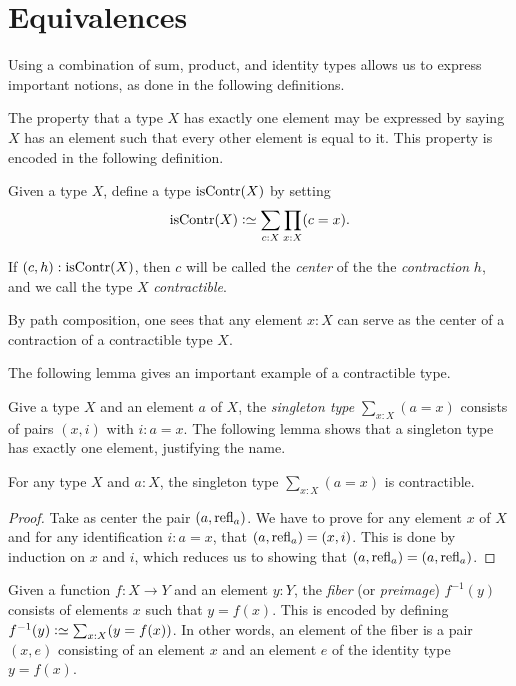 \section{Equivalences}\label{sec:equivalence}

Using a combination of sum, product, and identity types allows
us to express important notions, as done in the following
definitions.

The property that a type $X$ has exactly one element may be expressed by saying $X$ has an element such that every other element is equal to it.
This property is encoded in the following definition.

\begin{definition}
  \label{def:contractible}
  Given a type $X$, define a type $\iscontr(X)$ by setting
  \[
    \iscontr(X) \defeq \sum_{c:X} \prod_{x:X} (c=x).\qedhere
  \]
\end{definition}

If $ (c,h) : \iscontr(X) $, then $c$ will be called the \emph{center} of the
the \emph{contraction} $h$, and we call the type $X$ \emph{contractible}.

By path composition, one sees that any element $x : X$ can serve as the center of a contraction of a contractible type $X$.

The following lemma gives an important example of a contractible type.

Give a type $X$ and an element $a$ of $X$, 
the \emph{singleton type} $\sum_{x:X} (a=x)$
consists of pairs $(x,i)$ with $i: a=x$. The following lemma shows that a singleton type has exactly one element, justifying the name.

\begin{lemma}\label{lem:thepathspaceiscontractible}
For any type $X$ and $a:X$, the singleton type $\sum_{x:X} (a=x)$ is contractible.
\end{lemma}

\begin{proof}
Take as center the pair $(a,\mathrm{refl}_{a})$. We have
to prove for any element $x$ of $X$ and for any identification
$i: a=x$, that $(a,\mathrm{refl}_{a}) = (x,i)$.  This is done by induction on $x$ and $i$, which reduces us to showing
that $(a,\mathrm{refl}_{a}) = (a,\mathrm{refl}_{a})$.
\end{proof}

\begin{definition}
\label{def:fiber}
Given a function $f : X \to Y$ and an element $y:Y$, 
the \emph{fiber} (or \emph{preimage}) $f^{-1}(y)$ consists 
of elements $x$ such that $y = f(x)$.
This is encoded by defining $f^{-1}(y) \defeq \sum_{x:X}(y = f(x))$.
In other words, an element of the fiber is a pair $(x,e)$ consisting
of an element $x$ and an element $e$ of the identity type $y = f(x)$.
\end{definition}

